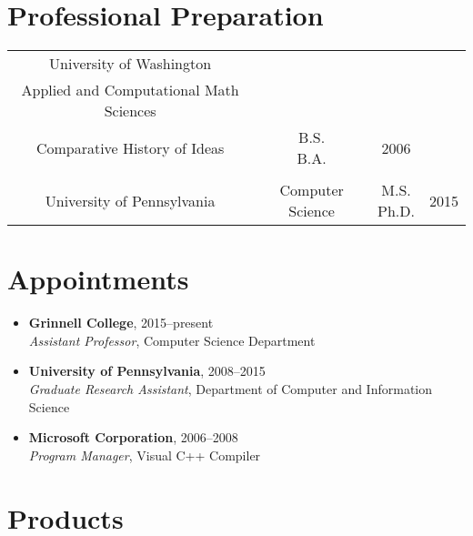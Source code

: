 \documentclass[11pt]{article}
\begin{document}
\startdoc{\shorttitle}

\section*{Professional Preparation}
\begin{tabular}[h]{cccc}
  University of Washington &
    \begin{minipage}{7cm}
      \begin{center}
        Computer Science \\ Applied and Computational Math Sciences \\ Comparative History of Ideas
      \end{center}
    \end{minipage}
    & \pbox{20cm}{B.S. \\ B.A.} & 2006 \\
  \\
  University of Pennsylvania & Computer Science & \pbox{20cm}{M.S. \\ Ph.D.} & 2015
\end{tabular}

\section*{Appointments}
\begin{itemize}
  \item \textbf{Grinnell College}, 2015--present \\
    \emph{Assistant Professor}, Computer Science Department
  \item \textbf{University of Pennsylvania}, 2008--2015 \\
    \emph{Graduate Research Assistant}, Department of Computer and Information Science
  \item \textbf{Microsoft Corporation}, 2006--2008 \\
    \emph{Program Manager}, Visual C++ Compiler
\end{itemize}

\section*{Products}
\end{document}
